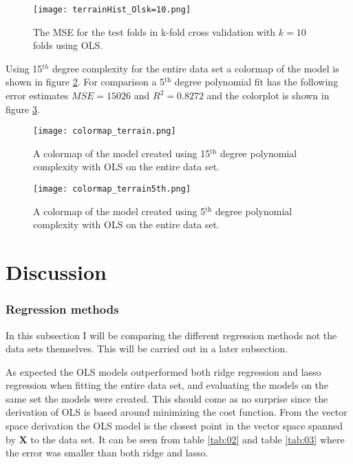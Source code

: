 \documentclass[uio,jmp,amsmath,amssymb,reprint,nofootinbib]{revtex4-1}
\numberwithin{equation}{section}
\begin{document}
\begin{figure}[H]
    \centering
    \texttt{[image: terrainHist\_Olsk=10.png]}
    \caption{The MSE for the test folds in k-fold cross validation with \(k=10\) folds using OLS.}
    \label{fig:hist_terrain_ols}
\end{figure}

Using 15\(^{th}\) degree complexity for the entire data set a colormap of the model is shown in figure \ref{fig:colormap_terrain_model}. For comparison a 5\(^\text{th}\) degree polynomial fit has the following error estimates \(MSE = 15026\) and \(R^2 = 0.8272\) and the colorplot is shown in figure \ref{fig:colormap_terrain_model5th}.

\begin{figure}[H]
    \centering
    \texttt{[image: colormap\_terrain.png]}
    \caption{A colormap of the model created using 15\(^\text{th}\) degree polynomial complexity with OLS on the entire data set.}
    \label{fig:colormap_terrain_model}
\end{figure}

\begin{figure}[H]
    \centering
    \texttt{[image: colormap\_terrain5th.png]}
    \caption{A colormap of the model created using 5\(^\text{th}\) degree polynomial complexity with OLS on the entire data set.}
    \label{fig:colormap_terrain_model5th}
\end{figure}

\section{Discussion}\label{sec:Discussion}

\subsubsection{Regression methods}

In this subsection I will be comparing the different regression methods not the data sets themselves. This will be carried out in a later subsection.

As expected the OLS models outperformed both ridge regression and lasso regression when fitting the entire data set, and evaluating the models on the same set the models were created. This should come as no surprise since the derivation of OLS is based around minimizing the cost function. From the vector space derivation the OLS model is the closest point in the vector space spanned by \(\bm{X}\) to the data set. It can be seen from table \ref{tab:02} and table \ref{tab:03} where the error was smaller than both ridge and lasso.
\end{document}
